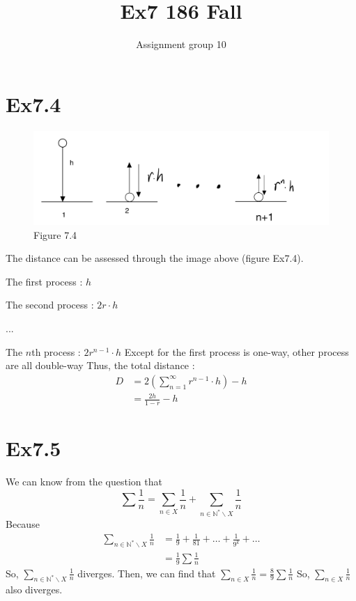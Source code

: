 \documentclass[11pt,twoside,a4paper]{article}
\begin{document}
\title{Ex7 186 Fall}
\author{Assignment group 10}
\date{}
\maketitle

\section{Ex7.4}
\begin{figure}[H]
    \centering
    \includegraphics[scale=0.5]{Ex7.4.png}
    \caption{Figure 7.4}
    \end{figure}
The distance can be assessed through the image above (figure Ex7.4).
\par 
The first process : $h$
\par 
The second process : $2r\cdot h$
\par 
$. . .$
\par 
The $n$th process : $2r^{n-1}\cdot h$
\newline
Except for the first process is one-way, other process are all double-way
Thus, the total distance :
\begin{equation}
    \begin{aligned}
        D&=2(\sum_{n = 1}^{\infty} r^{n-1} \cdot h)-h\\
        &=\frac{2h}{1-r}-h
    \end{aligned}
    \end{equation}

\section{Ex7.5}
We can know from the question that 
$$\displaystyle \sum \frac{1}{n}= \sum _{n\in X} \frac{1}{n} +\sum _{n \in \mathbb{N}^* \backslash X} \frac{1}{n}$$
Because 
\begin{equation}
    \begin{aligned}
        \displaystyle \sum _{n \in \mathbb{N}^* \backslash X} \frac{1}{n} &=
        \frac{1}{9}+\frac{1}{81}+\dots+\frac{1}{9^k}+\dots\\
        &=\frac{1}{9}\sum \frac{1}{n}
    \end{aligned}
    \end{equation}
So, $\displaystyle \sum _{n \in \mathbb{N}^* \backslash X} \frac{1}{n}$ diverges.
\newline
Then, we can find that $\displaystyle\sum _{n\in X} \frac{1}{n}=\frac{8}{9}\sum \frac{1}{n}$
So, $\displaystyle \sum _{n \in X} \frac{1}{n}$ also diverges.
\end{document}
